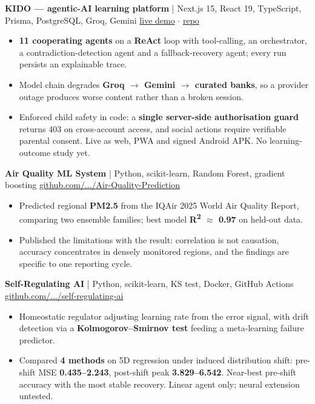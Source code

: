 \documentclass[a4paper,10pt]{article}
\newcommand{\project}[3]{%
  \textbf{#1} \; | \; \small #2 \hfill \small #3\\[0.15em]
}
\begin{document}
\project{KIDO --- agentic-AI learning platform}{Next.js 15, React 19, TypeScript, Prisma, PostgreSQL, Groq, Gemini}{\href{https://kido-orcin.vercel.app}{live demo} $\cdot$ \href{https://github.com/FarhanRajputFelix/KIDO}{repo}}
\begin{itemize}
  \item \textbf{11 cooperating agents} on a \textbf{ReAct} loop with tool-calling, an orchestrator,
        a contradiction-detection agent and a fallback-recovery agent; every run persists an
        explainable trace.
  \item Model chain degrades \textbf{Groq $\rightarrow$ Gemini $\rightarrow$ curated banks}, so a
        provider outage produces worse content rather than a broken session.
  \item Enforced child safety in code: a \textbf{single server-side authorisation guard} returns 403
        on cross-account access, and social actions require verifiable parental consent.
        Live as web, PWA and signed Android APK. No learning-outcome study yet.
\end{itemize}

\project{Air Quality ML System}{Python, scikit-learn, Random Forest, gradient boosting}{\href{https://github.com/FarhanRajputFelix/Air-Quality-Prediction}{github.com/.../Air-Quality-Prediction}}
\begin{itemize}
  \item Predicted regional \textbf{PM2.5} from the IQAir 2025 World Air Quality Report, comparing
        two ensemble families; best model \textbf{R\textsuperscript{2} $\approx$ 0.97} on held-out data.
  \item Published the limitations with the result: correlation is not causation, accuracy
        concentrates in densely monitored regions, and the findings are specific to one reporting
        cycle.
\end{itemize}

\project{Self-Regulating AI}{Python, scikit-learn, KS test, Docker, GitHub Actions}{\href{https://github.com/FarhanRajputFelix/self-regulating-ai}{github.com/.../self-regulating-ai}}
\begin{itemize}
  \item Homeostatic regulator adjusting learning rate from the error signal, with drift detection
        via a \textbf{Kolmogorov--Smirnov test} feeding a meta-learning failure predictor.
  \item Compared \textbf{4 methods} on 5D regression under induced distribution shift: pre-shift MSE
        \textbf{0.435--2.243}, post-shift peak \textbf{3.829--6.542}. Near-best pre-shift accuracy
        with the most stable recovery. Linear agent only; neural extension untested.
\end{itemize}
\end{document}
